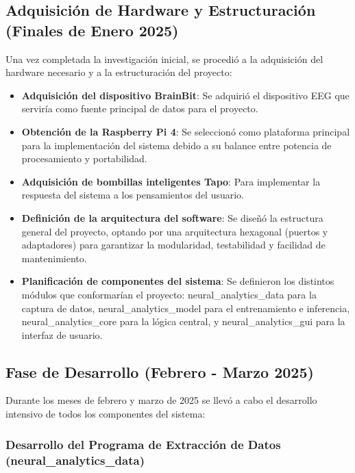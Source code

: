 \subsection{Adquisición de Hardware y Estructuración (Finales de Enero 2025)}

Una vez completada la investigación inicial, se procedió a la adquisición del hardware necesario y a la estructuración del proyecto:

\begin{itemize}
    \item \textbf{Adquisición del dispositivo BrainBit}: Se adquirió el dispositivo EEG que serviría como fuente principal de datos para el proyecto.
    
    \item \textbf{Obtención de la Raspberry Pi 4}: Se seleccionó como plataforma principal para la implementación del sistema debido a su balance entre potencia de procesamiento y portabilidad.
    
    \item \textbf{Adquisición de bombillas inteligentes Tapo}: Para implementar la respuesta del sistema a los pensamientos del usuario.
    
    \item \textbf{Definición de la arquitectura del software}: Se diseñó la estructura general del proyecto, optando por una arquitectura hexagonal (puertos y adaptadores) para garantizar la modularidad, testabilidad y facilidad de mantenimiento.
    
    \item \textbf{Planificación de componentes del sistema}: Se definieron los distintos módulos que conformarían el proyecto: neural\_analytics\_data para la captura de datos, neural\_analytics\_model para el entrenamiento e inferencia, neural\_analytics\_core para la lógica central, y neural\_analytics\_gui para la interfaz de usuario.
\end{itemize}

\subsection{Fase de Desarrollo (Febrero - Marzo 2025)}

Durante los meses de febrero y marzo de 2025 se llevó a cabo el desarrollo intensivo de todos los componentes del sistema:

\subsubsection{Desarrollo del Programa de Extracción de Datos (neural\_analytics\_data)}

